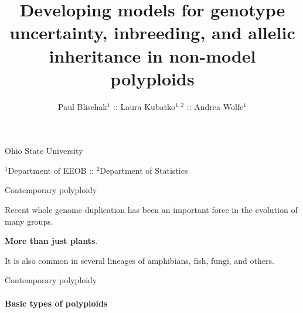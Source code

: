 \documentclass[presentation,sansserif]{beamer}
\title[Developing pop-gen models for polyploids]{Developing models for genotype uncertainty, inbreeding, and allelic inheritance in non-model polyploids}
\author[Blischak \textit{et al}.]{Paul Blischak$^1$ :: Laura Kubatko$^{1,2}$ :: Andrea Wolfe$^1$}
\date{}
\begin{document}
\beamertemplatenavigationsymbolsempty

\begin{frame}[plain]
	\vspace{-1.2in}
	\titlepage
	
	\vspace{-1.2in}
	\begin{center}
	
		{\footnotesize Ohio State University 	
		\vspace{0.05in}
		
		$^1$Department of EEOB :: $^2$Department of Statistics
		}		
	\end{center}
	\vspace{-0.2in}
		
\end{frame}


\begin{frame}[t]{Contemporary polyploidy}
  \vspace{0.3in}
  \pause
  
  Recent whole genome duplication has been an important force in the evolution of many groups.
  \vspace{0.3in}
  \pause
  
  \textbf{More than just plants}.
  \vspace{0.3in}
  \pause
    
  It is also common in several lineages of amphibians, fish, fungi, and others.

\end{frame}

\begin{frame}[t]{Contemporary polyploidy}
\framesubtitle{Basic types of polyploids}


	\begin{center}
	\end{center}
	
	
	\begin{center}
	\end{center}

\end{frame}
\end{document}
